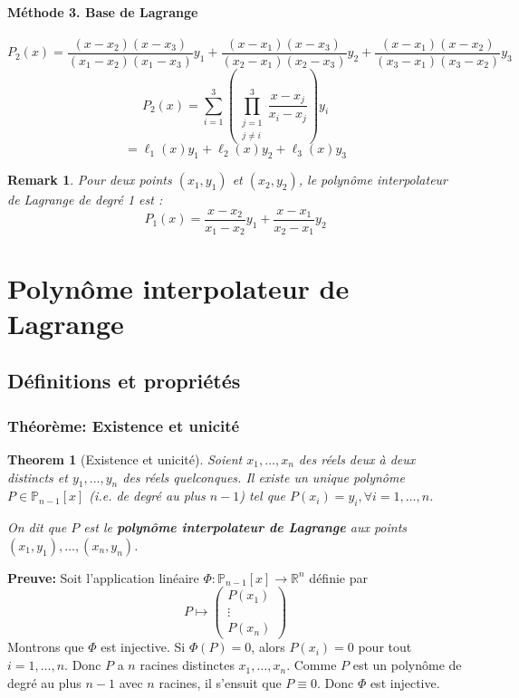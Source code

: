 \documentclass{article}
\newtheorem{theorem}{Theorem}
\newtheorem{remark}{Remark}
\begin{document}
\paragraph{Méthode 3. Base de Lagrange}

\[
P_2(x) = \frac{(x-x_2)(x-x_3)}{(x_1-x_2)(x_1-x_3)} y_1 + \frac{(x-x_1)(x-x_3)}{(x_2-x_1)(x_2-x_3)} y_2 + \frac{(x-x_1)(x-x_2)}{(x_3-x_1)(x_3-x_2)} y_3
\]
\[
P_2(x) = \sum_{i=1}^3 \left( \prod_{\substack{j=1 \\ j \neq i}}^3 \frac{x-x_j}{x_i-x_j} \right) y_i
\]
\[
= \ell_1(x) y_1 + \ell_2(x) y_2 + \ell_3(x) y_3
\]

\begin{remark}
Pour deux points $(x_1, y_1)$ et $(x_2, y_2)$, le polynôme interpolateur de Lagrange de degré 1 est :
\[
P_1(x) = \frac{x-x_2}{x_1-x_2} y_1 + \frac{x-x_1}{x_2-x_1} y_2
\]
\end{remark}

\section{Polynôme interpolateur de Lagrange}

\subsection{Définitions et propriétés}

\subsubsection{Théorème: Existence et unicité}

\begin{theorem}[Existence et unicité]
Soient $x_1, \dots, x_n$ des réels deux à deux distincts et $y_1, \dots, y_n$ des réels quelconques.
Il existe un unique polynôme $P \in \mathbb{P}_{n-1}[x]$ (i.e. de degré au plus $n-1$) tel que $P(x_i) = y_i, \forall i = 1, \dots, n$.

On dit que $P$ est le \textbf{polynôme interpolateur de Lagrange} aux points $(x_1, y_1), \dots, (x_n, y_n)$.
\end{theorem}

\textbf{Preuve:}
Soit l'application linéaire $\Phi : \mathbb{P}_{n-1}[x] \to \mathbb{R}^n$ définie par
\[
P \mapsto \begin{pmatrix} P(x_1) \\ \vdots \\ P(x_n) \end{pmatrix}
\]
Montrons que $\Phi$ est injective.
Si $\Phi(P) = 0$, alors $P(x_i) = 0$ pour tout $i=1, \dots, n$. Donc $P$ a $n$ racines distinctes $x_1, \dots, x_n$.
Comme $P$ est un polynôme de degré au plus $n-1$ avec $n$ racines, il s'ensuit que $P \equiv 0$.
Donc $\Phi$ est injective.
\end{document}
